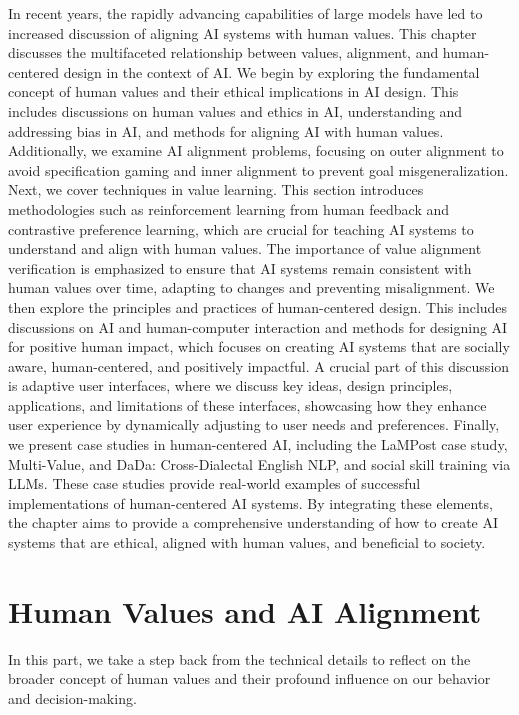 \documentclass[
  letterpaper,
  DIV=11,
  numbers=noendperiod,
  oneside]{scrreprt}
\theoremstyle{remark}
\begin{document}
In recent years, the rapidly advancing capabilities of large models have
led to increased discussion of aligning AI systems with human values.
This chapter discusses the multifaceted relationship between values,
alignment, and human-centered design in the context of AI. We begin by
exploring the fundamental concept of human values and their ethical
implications in AI design. This includes discussions on human values and
ethics in AI, understanding and addressing bias in AI, and methods for
aligning AI with human values. Additionally, we examine AI alignment
problems, focusing on outer alignment to avoid specification gaming and
inner alignment to prevent goal misgeneralization. Next, we cover
techniques in value learning. This section introduces methodologies such
as reinforcement learning from human feedback and contrastive preference
learning, which are crucial for teaching AI systems to understand and
align with human values. The importance of value alignment verification
is emphasized to ensure that AI systems remain consistent with human
values over time, adapting to changes and preventing misalignment. We
then explore the principles and practices of human-centered design. This
includes discussions on AI and human-computer interaction and methods
for designing AI for positive human impact, which focuses on creating AI
systems that are socially aware, human-centered, and positively
impactful. A crucial part of this discussion is adaptive user
interfaces, where we discuss key ideas, design principles, applications,
and limitations of these interfaces, showcasing how they enhance user
experience by dynamically adjusting to user needs and preferences.
Finally, we present case studies in human-centered AI, including the
LaMPost case study, Multi-Value, and DaDa: Cross-Dialectal English NLP,
and social skill training via LLMs. These case studies provide
real-world examples of successful implementations of human-centered AI
systems. By integrating these elements, the chapter aims to provide a
comprehensive understanding of how to create AI systems that are
ethical, aligned with human values, and beneficial to society.

\section{Human Values and AI
Alignment}\label{human-values-and-ai-alignment-1}

In this part, we take a step back from the technical details to reflect
on the broader concept of human values and their profound influence on
our behavior and decision-making.
\end{document}
